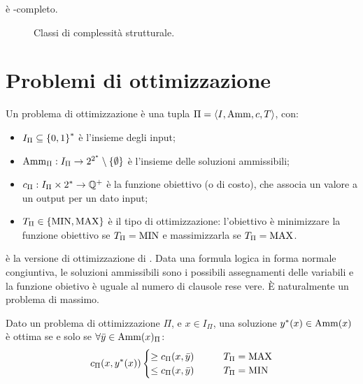 \begin{theorem}
	\Sat è \NP-completo.
\end{theorem}

\begin{figure}
	\centering
	
	\caption{Classi di complessità strutturale.}
	\label{fig:structcomplclass}
\end{figure}



\section{Problemi di ottimizzazione}

\begin{defin}
	Un problema di ottimizzazione è una tupla $\Pi=\langle I,\mathrm{Amm},c,T \rangle$, con:
	\begin{itemize}
		\item $I_\Pi\subseteq\left\{ 0,1 \right\}^*$ è l'insieme degli input;
		\item $\mathrm{Amm}_\Pi: I_\Pi\to2^{2^*}\setminus\left\{ \emptyset \right\}$ è l'insieme delle soluzioni ammissibili;
		\item $c_\Pi:I_\Pi\times 2^*\to\mathbb Q^+$ è la funzione obiettivo (o di costo), che associa un valore a un output per un dato input;
		\item $T_\Pi \in\left\{ \mathrm{MIN},\mathrm{MAX} \right\}$ è il tipo di ottimizzazione: l'obiettivo è minimizzare la funzione obiettivo se $T_\Pi=\mathrm{MIN}$ e massimizzarla se $T_\Pi=\mathrm{MAX}$.
	\end{itemize}
\end{defin}

\begin{examp}
	\MaxSat è la versione di ottimizzazione di \Sat. Data una formula logica in forma normale congiuntiva, le soluzioni ammissibili sono i possibili assegnamenti delle variabili e la funzione obietivo è uguale al numero di clausole rese vere. È naturalmente un problema di massimo.
\end{examp}

\begin{defin}
	Dato un problema di ottimizzazione $\Pi$, e $x\in I_\Pi$, una soluzione $y^*(x)\in\mathrm{Amm}(x)$ è ottima se e solo se $\forall \bar y\in\mathrm{Amm}(x)_\Pi$:
	\begin{equation*}
		c_\Pi(x,y^*(x))
		\begin{cases}
			\geq c_\Pi(x,\bar y) \qquad & T_\Pi=\mathrm{MAX} \\
			\leq c_\Pi(x,\bar y) \qquad & T_\Pi=\mathrm{MIN}
		\end{cases}
	\end{equation*}
\end{defin}

